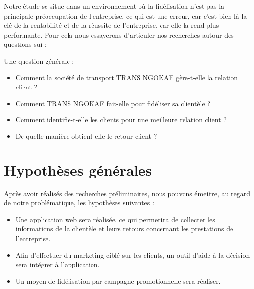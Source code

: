     Notre étude se situe dans un environnement où la fidélisation n'est pas la principale
    préoccupation de l’entreprise, ce qui est une erreur, car c’est bien là la clé
    de la rentabilité et de la réussite de l’entreprise, car elle la rend plus performante.
    Pour cela nous essayerons d’articuler nos recherches autour des questions sui : 
    \newline

    Une question générale :
    \newline 
        \begin{itemize}
            \item [\ding{226}] Comment la société de transport TRANS NGOKAF gère-t-elle
            la relation client ?
            \newline
            \item [\ding{226}] Comment TRANS NGOKAF fait-elle pour fidéliser sa clientèle ?
            \newline
            \item [\ding{226}] Comment identifie-t-elle les clients pour une
            meilleure relation client ?
            \newline
            \item [\ding{226}] De quelle manière obtient-elle le retour client ?
        \end{itemize}
    \section[Hypothèses générales]{Hypothèses générales}
    Après avoir réalisés des recherches préliminaires, nous pouvons émettre, au regard
    de notre problématique, les hypothèses suivantes : 
    \newline
    \begin{itemize}
        \item [\ding{226}] Une application web sera réalisée, ce qui permettra de collecter
        les informations de la clientèle et leurs retours concernant les prestations de l’entreprise.
        \newline
        \item [\ding{226}] Afin d’effectuer du marketing ciblé sur les clients, un outil d’aide à
        la décision sera intégrer à l’application.
        \newline
        \item [\ding{226}] Un moyen de fidélisation par campagne promotionnelle sera réaliser.
        \newline
    \end{itemize}
    
